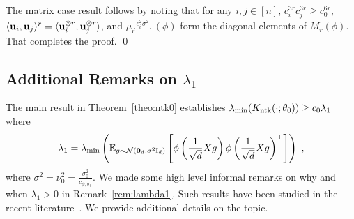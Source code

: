 The matrix case result follows by noting that for any $i, j \in [n]$, $c_i^{3r} c_j^{3r} \geq c_0^{6r}$, $\langle \mathbf{u}_i , \mathbf{u}_j \rangle^r = \langle \mathbf{u}_i^{\otimes r}, \mathbf{u}_j^{\otimes r} \rangle$, and $\mu_r^{[c_i^2 \sigma^2]}(\phi)$ form the diagonal elements of $M_r(\phi)$. That completes the proof. \qed 


\subsection{Additional Remarks on $\lambda_1$}
\label{ssec:lambda1}
The main result in Theorem~\ref{theo:ntk0} establishes $\lambda_{\min}( K_{\operatorname{ntk}}(\cdot ;\theta_0) ) \geq c_0 \lambda_1$ where 
\begin{align*}
\lambda_1 = \lambda_{\min}\left(\mathbb{E}_{g \sim 
{\cal N}(\bm{0}_{d},\sigma^2 \mathbb{I}_{d})}\left[ \phi\left(\frac{1}{\sqrt{d}} X g\right) \phi\left(\frac{1}{\sqrt{d}} X g\right)^\top\right]\right)~,
\end{align*}
where $\sigma^2 = \nu_0^2 = \frac{\sigma_0^2}{c_{\phi,\sigma_0}}$.
We made some high level informal remarks on why and when $\lambda_1 > 0$ in Remark~\ref{rem:lambda1}. Such results have been studied in the recent literature~\citep{SD-JL-HL-LW-XZ:19,DZ-YC-DZ-QG:20,ZAZ-YL-ZS:19,oymak2020hermite,ng2021hermite2}. %
We provide additional details on the topic.

